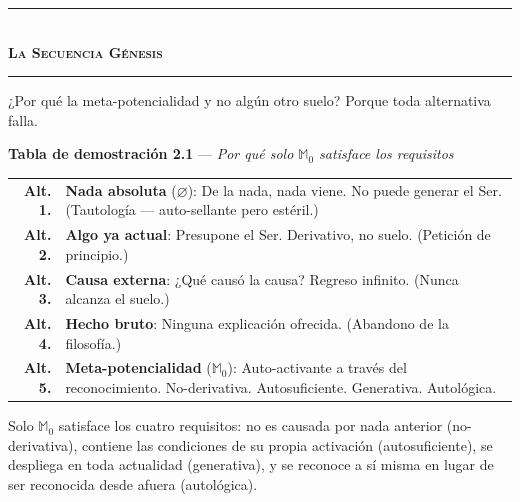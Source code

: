 \documentclass[10pt, openany, oneside]{book}
\renewcommand{\normalsize}{\fontsize{10}{13}\selectfont}
\begin{document}
\vspace{1.5em}


\begin{center}
    \rule{0.3\textwidth}{0.4pt}\\[0.5em]
    {\normalsize\bfseries\scshape La Secuencia Génesis}\\[0.3em]
    \rule{0.3\textwidth}{0.4pt}
\end{center}

\vspace{1em}

\noindent ¿Por qué la meta-potencialidad y no algún otro suelo? Porque toda alternativa falla.

\vspace{0.5em}

\textbf{Tabla de demostración 2.1} --- \textit{Por qué solo $\mathbb{M}_0$ satisface los requisitos}

\vspace{0.5em}

\noindent\begin{tabular}{r p{}}
\textbf{Alt. 1.} & \textbf{Nada absoluta} ($\varnothing$): De la nada, nada viene. No puede generar el Ser. (Tautología --- auto-sellante pero estéril.) \\[0.3em]
\textbf{Alt. 2.} & \textbf{Algo ya actual}: Presupone el Ser. Derivativo, no suelo. (Petición de principio.) \\[0.3em]
\textbf{Alt. 3.} & \textbf{Causa externa}: ¿Qué causó la causa? Regreso infinito. (Nunca alcanza el suelo.) \\[0.3em]
\textbf{Alt. 4.} & \textbf{Hecho bruto}: Ninguna explicación ofrecida. (Abandono de la filosofía.) \\[0.3em]
\textbf{Alt. 5.} & \textbf{Meta-potencialidad} ($\mathbb{M}_0$): Auto-activante a través del reconocimiento. No-derivativa. Autosuficiente. Generativa. Autológica. \\[0.3em]
\end{tabular}

\vspace{0.8em}

\noindent Solo $\mathbb{M}_0$ satisface los cuatro requisitos: no es causada por nada anterior (no-derivativa), contiene las condiciones de su propia activación (autosuficiente), se despliega en toda actualidad (generativa), y se reconoce a sí misma en lugar de ser reconocida desde afuera (autológica).
\end{document}
